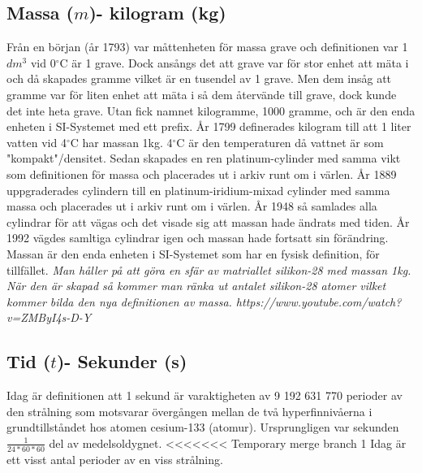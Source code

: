 \documentclass[a4paper,11pt]{article}
\begin{document}
\begin{flushleft}
\subsection{Massa ($m$)- kilogram (kg)}
Från en början (år 1793) var måttenheten för massa grave och definitionen var 1$dm^3$ vid 0$^{\circ}$C är 1 grave.
Dock ansångs det att grave var för stor enhet att mäta i och då skapades gramme vilket är en tusendel av 1 grave.
Men dem insåg att gramme var för liten enhet att mäta i så dem återvände till grave, dock kunde det inte heta grave. 
Utan fick namnet kilogramme, 1000 gramme, och är den enda enheten i SI-Systemet med ett prefix.\newline\newline
År 1799 definerades kilogram till att 1 liter vatten vid 4$^{\circ}$C har massan 1kg. 4$^{\circ}$C är den temperaturen
då vattnet är som "kompakt"/densitet.\newline
Sedan skapades en ren platinum-cylinder med samma vikt som definitionen för massa och placerades ut i arkiv runt om i värlen.\newline\newline
År 1889 uppgraderades cylindern till en platinum-iridium-mixad cylinder med samma massa och placerades ut i arkiv runt om i värlen.\newline\newline
År 1948 så samlades alla cylindrar för att vägas och det visade sig att massan hade ändrats med tiden.\newline\newline
År 1992 vägdes samltiga cylindrar igen och massan hade fortsatt sin förändring.\newline\newline
Massan är den enda enheten i SI-Systemet som har en fysisk definition, för tillfället.\newline
\textit{Man håller på att göra en sfär av matriallet silikon-28 med massan 1kg. När den är skapad så kommer man
ränka ut antalet silikon-28 atomer vilket kommer bilda den nya definitionen av massa. https://www.youtube.com/watch?v=ZMByI4s-D-Y}
\newline
\newline
\subsection{Tid ($t$)- Sekunder (s)}
Idag är definitionen att 1 sekund är varaktigheten av 9 192 631 770 perioder av den strålning som motsvarar övergången mellan de två 
hyperfinnivåerna i grundtillståndet hos atomen cesium-133 (atomur). \newline \newline
Ursprungligen var sekunden $ \frac{1}{24*60*60} $ del av medelsoldygnet.
\newline
<<<<<<< Temporary merge branch 1
Idag är ett visst antal perioder av en viss strålning.
\newline
\newline

\end{flushleft}
\end{document}
